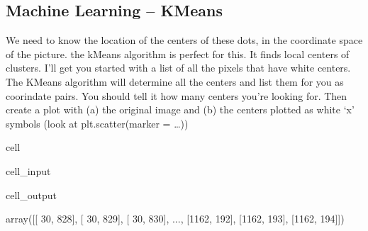 \documentclass[letterpaper,10pt,english]{jupyterBook}
\begin{document}
\subsection{Machine Learning – KMeans}
\label{\detokenize{lessons/Hobo_Student:machine-learning-kmeans}}
\sphinxAtStartPar
We need to know the location of the centers of these dots, in the coordinate space of the picture. the kMeans algorithm is perfect for this. It finds local centers of clusters. I’ll get you started with a list of all the pixels that have white centers. The KMeans algorithm will determine all the centers and list them for you as coorindate pairs. You should tell it how many centers you’re looking for. Then create a plot with (a) the original image and (b) the centers plotted as white ‘x’ symbols (look at plt.scatter(marker = …))

\begin{sphinxuseclass}{cell}\begin{sphinxVerbatimInput}

\begin{sphinxuseclass}{cell_input}
\begin{sphinxVerbatim}[commandchars=\\\{\}]
   

    
\end{sphinxVerbatim}

\end{sphinxuseclass}\end{sphinxVerbatimInput}
\begin{sphinxVerbatimOutput}

\begin{sphinxuseclass}{cell_output}
\begin{sphinxVerbatim}[commandchars=\\\{\}]
array([[  30,  828],
       [  30,  829],
       [  30,  830],
       ...,
       [1162,  192],
       [1162,  193],
       [1162,  194]])
\end{sphinxVerbatim}

\end{sphinxuseclass}\end{sphinxVerbatimOutput}

\end{sphinxuseclass}
\end{document}
